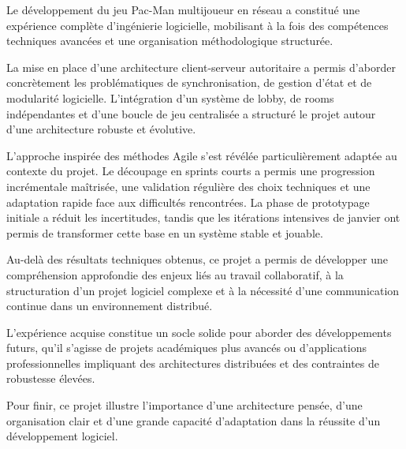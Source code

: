 \documentclass[a4paper, 11pt]{article}
\begin{document}
Le développement du jeu Pac-Man multijoueur en réseau a constitué une expérience complète d’ingénierie logicielle, mobilisant à la fois des compétences techniques avancées et une organisation méthodologique structurée.

La mise en place d’une architecture client-serveur autoritaire a permis d’aborder concrètement les problématiques de synchronisation, de gestion d’état et de modularité logicielle. 
L’intégration d’un système de lobby, de rooms indépendantes et d’une boucle de jeu centralisée a structuré le projet autour d’une architecture robuste et évolutive.

L’approche inspirée des méthodes Agile s’est révélée particulièrement adaptée au contexte du projet. 
Le découpage en sprints courts a permis une progression incrémentale maîtrisée, une validation régulière des choix techniques et une adaptation rapide face aux difficultés rencontrées. 
La phase de prototypage initiale a réduit les incertitudes, tandis que les itérations intensives de janvier ont permis de transformer cette base en un système stable et jouable.

Au-delà des résultats techniques obtenus, ce projet a permis de développer une compréhension approfondie des enjeux liés au travail collaboratif, à la structuration d’un projet logiciel complexe et à la nécessité d’une communication continue dans un environnement distribué.

L’expérience acquise constitue un socle solide pour aborder des développements futurs, qu’il s’agisse de projets académiques plus avancés ou d’applications professionnelles impliquant des architectures distribuées et des contraintes de robustesse élevées.

Pour finir, ce projet illustre l’importance d’une architecture pensée, d’une organisation clair et d’une grande capacité d’adaptation dans la réussite d’un développement logiciel.
\end{document}

